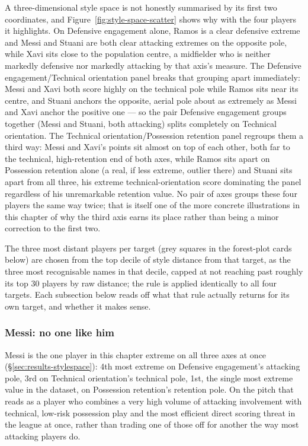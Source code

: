 A three-dimensional style space is not honestly summarised by its first two coordinates, and
Figure~\ref{fig:style-space-scatter} shows why with the four players it highlights. On Defensive engagement
alone, Ramos is a clear defensive extreme and Messi and Stuani are both clear attacking extremes on the
opposite pole, while Xavi sits close to the population centre, a midfielder who is neither markedly defensive
nor markedly attacking by that axis's measure. The Defensive engagement/Technical orientation panel breaks
that grouping apart immediately: Messi and Xavi both score highly on the technical pole while Ramos sits near
its centre, and Stuani anchors the opposite, aerial pole about as extremely as Messi and Xavi anchor the
positive one --- so the pair Defensive engagement groups together (Messi and Stuani, both attacking) splits
completely on Technical orientation. The Technical orientation/Possession retention panel regroups them a
third way: Messi and Xavi's points sit almost on top of each other, both far to the technical, high-retention
end of both axes, while Ramos sits apart on Possession retention alone (a real, if less extreme, outlier
there) and Stuani sits apart from all three, his extreme technical-orientation score dominating the panel
regardless of his unremarkable retention value. No pair of axes groups these four players the same way twice;
that is itself one of the more concrete illustrations in this chapter of why the third axis earns its place
rather than being a minor correction to the first two.

The three most distant players per target (grey squares in the forest-plot cards below) are chosen from the
top decile of style distance from that target, as the three most recognisable names in that decile, capped at
not reaching past roughly its top 30 players by raw distance; the rule is applied identically to all four
targets. Each subsection below reads off what that rule actually returns for its own target, and whether it
makes sense.

\FloatBarrier

\subsubsection{Messi: no one like him}

Messi is the one player in this chapter extreme on all three axes at once (\S\ref{sec:results-stylespace}):
4th most extreme on Defensive engagement's attacking pole, 3rd on Technical orientation's technical pole, 1st,
the single most extreme value in the dataset, on Possession retention's retention pole. On the pitch that
reads as a player who combines a very high volume of
attacking involvement with technical, low-risk possession play and the most efficient direct scoring threat in
the league at once, rather than trading one of those off for another the way most attacking players do.

